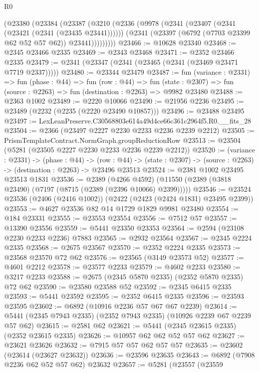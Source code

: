 \begin{lexlean}{R0}
\begin{coremodule}
      (@23380
        (@23384
          (@23387
            (@3210
              (@2336
                (@9978
                  (@2341 (@23407 (@2341 (@23421 (@2341 (@23435 @23441))))))
                  (@2341 (@23397 (@6792 (@7703 @23399 @62 @52 @57 @62)) @23441)))))))))
@23466 := @10628 @23340
@23468 := @2345 @23466 @2335
@23469 := @2343 @23468
@23471 := @2352 @23466 @2335
@23479 := @2341 (@23347 (@2341 (@23465 (@2341 (@23469 @23471 @7719 @2337)))))
@23480 := @23344 @23479
@23487 := fun (variance : @2331) =>
  fun (phase : @44) =>
  fun (row : @44) =>
  fun (state : @2307) => fun (source : @2263) => fun (destination : @2263) => @9982 @23480
@23488 := @2363 @1002
@23489 := @2220 @10066
@23490 := @21956 @2236
@23495 := @23489 (@2232 (@2235 (@2220 @23490 @10857)))
@23496 := @23488 @23495
@23497 := LexLeanPreserve.C30568803e614a49d4ce66c361c2964f5.R0.__fits_28
@23504 := @2366 (@23497 @2227 @2230 @2233 @2236 @2239 @2212)
@23505 := PrismTemplateContract.NormGraph.groupReductionRow
@23513 := @23504 (@5281 (@23505 @2227 @2230 @2233 @2236 @2239 @2212))
@23520 := (variance : @2331) ->
  (phase : @44) ->
  (row : @44) -> (state : @2307) -> (source : @2263) -> (destination : @2263) -> @23496 @23513
@23524 := @2381 @1002 @23495 @23513 @1831
@23536 := @2389
    (@4266 @4592)
    (@11550 (@2389 (@3818 @23490) (@7197 (@8715 (@2389 (@2396 @10066) @2399)))))
@23546 := @23524 @23536 (@2406 (@2416 @1002)) (@2422 (@2423 (@2424 @1831) @23495 @2399))
@23553 := @4627 @23536 @82 @14 @1729 @1829 @9981 @23480
@23554 := @184 @23331
@23555 := @23553 @23554
@23556 := @7512 @57
@23557 := @13390 @23556
@23559 := @5441 @23350 @23353
@23564 := @2594 (@23108 @2230 @2233 @2236) @7883
@23565 := @2932 @23564
@23567 := @2345 @2224 @2335
@23568 := @2675 @23567
@23570 := @2352 @2224 @2335
@23573 := @23568 @23570 @72 @62
@23576 := @23565 (@3149 @23573 @52)
@23577 := @4601 @2212
@23578 := @23577 @2233
@23579 := @4602 @2233
@23580 := @3217 @2233
@23588 := @2675 (@2345 @5870 @2335) (@2352 @5870 @2335) @72 @62
@23590 := @23580 @23588 @52
@23592 := @2345 @6415 @2335
@23593 := @5441 @23592
@23595 := @2352 @6415 @2335
@23596 := @23593 @23595
@23602 := @6892 (@10916 @2236 @57 @67 @67 @2239)
@23614 := @5441 (@2345 @7943 @2335) (@2352 @7943 @2335) (@10926 @2239 @67 @2239 @57 @62)
@23615 := @2581 @62
@23621 := @5441 (@2345 @23615 @2335) (@2352 @23615 @2335)
@23626 := @10957 @62 @62 @52 @57 @62
@23627 := @23621 @23626
@23632 := @7915 @57 @57 @62 @57 @57
@23635 := @23602 (@23614 (@23627 @23632))
@23636 := @23596 @23635
@23643 := @6892 (@7908 @2236 @62 @52 @57 @62) @23632
@23657 := @5281
    (@23557
      (@23559

\end{coremodule}
\end{lexlean}
